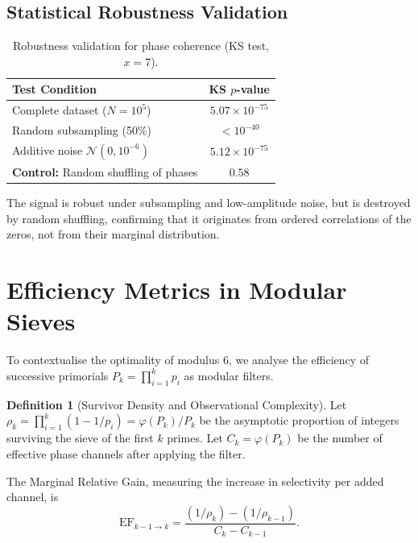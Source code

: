 \documentclass[12pt,a4paper]{article}
\theoremstyle{plain}
\theoremstyle{definition}
\newtheorem{definition}[theorem]{Definition}
\theoremstyle{remark}
\begin{document}
\subsection{Statistical Robustness Validation}
\label{app:robustness}

\begin{table}[H]
\centering
\caption{Robustness validation for phase coherence (KS test, \(x=7\)).}
\label{tab:robustness}
\begin{tabular}{@{}lc@{}}
\toprule
\textbf{Test Condition} & \textbf{KS \(p\)-value} \\
\midrule
Complete dataset (\(N=10^5\)) & \(5.07 \times 10^{-75}\) \\
Random subsampling (50\%) & \(< 10^{-40}\) \\
Additive noise \(\mathcal{N}(0, 10^{-6})\) & \(5.12 \times 10^{-75}\) \\
\textbf{Control:} Random shuffling of phases & \(0.58\) \\
\bottomrule
\end{tabular}
\end{table}

The signal is robust under subsampling and low-amplitude noise, but is destroyed by random shuffling, confirming that it originates from ordered correlations of the zeros, not from their marginal distribution.

\section{Efficiency Metrics in Modular Sieves}
\label{app:sieve_efficiency}

To contextualise the optimality of modulus 6, we analyse the efficiency of successive primorials \(P_k = \prod_{i=1}^k p_i\) as modular filters.

\begin{definition}[Survivor Density and Observational Complexity]
Let \(\rho_k = \prod_{i=1}^k (1 - 1/p_i) = \varphi(P_k)/P_k\) be the asymptotic proportion of integers surviving the sieve of the first \(k\) primes. Let \(C_k = \varphi(P_k)\) be the number of effective phase channels after applying the filter.
\end{definition}

The Marginal Relative Gain, measuring the increase in selectivity per added channel, is
\begin{equation}
\mathrm{EF}_{k-1 \to k} = \frac{(1/\rho_k) - (1/\rho_{k-1})}{C_k - C_{k-1}}.
\label{eq:EF}
\end{equation}
\end{document}
